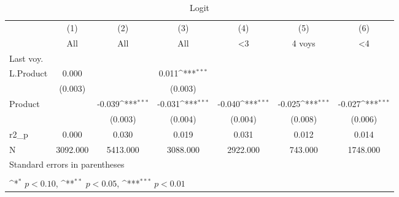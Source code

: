 \begin{table}[htbp]\centering
\def\sym#1{\ifmmode^{#1}\else\(^{#1}\)\fi}
\caption{Logit }
\begin{tabular}{l*{6}{c}}
\hline\hline
                    &\multicolumn{1}{c}{(1)}&\multicolumn{1}{c}{(2)}&\multicolumn{1}{c}{(3)}&\multicolumn{1}{c}{(4)}&\multicolumn{1}{c}{(5)}&\multicolumn{1}{c}{(6)}\\
                    &\multicolumn{1}{c}{All}&\multicolumn{1}{c}{All}&\multicolumn{1}{c}{All}&\multicolumn{1}{c}{<3}&\multicolumn{1}{c}{4 voys}&\multicolumn{1}{c}{<4}\\
\hline
Last voy.           &                     &                     &                     &                     &                     &                     \\
L.Product           &       0.000         &                     &       0.011\sym{***}&                     &                     &                     \\
                    &     (0.003)         &                     &     (0.003)         &                     &                     &                     \\
Product             &                     &      -0.039\sym{***}&      -0.031\sym{***}&      -0.040\sym{***}&      -0.025\sym{***}&      -0.027\sym{***}\\
                    &                     &     (0.003)         &     (0.004)         &     (0.004)         &     (0.008)         &     (0.006)         \\
\hline
r2\_p                &       0.000         &       0.030         &       0.019         &       0.031         &       0.012         &       0.014         \\
N                   &    3092.000         &    5413.000         &    3088.000         &    2922.000         &     743.000         &    1748.000         \\
\hline\hline
\multicolumn{7}{l}{\footnotesize Standard errors in parentheses}\\
\multicolumn{7}{l}{\footnotesize  }\\
\multicolumn{7}{l}{\footnotesize \sym{*} \(p<0.10\), \sym{**} \(p<0.05\), \sym{***} \(p<0.01\)}\\
\end{tabular}
\end{table}
